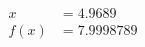 \documentclass[preview]{standalone}
\begin{document}
\begin{align*}
x &= 4.9689\\f(x) &= 7.9998789
\end{align*}
\end{document}

